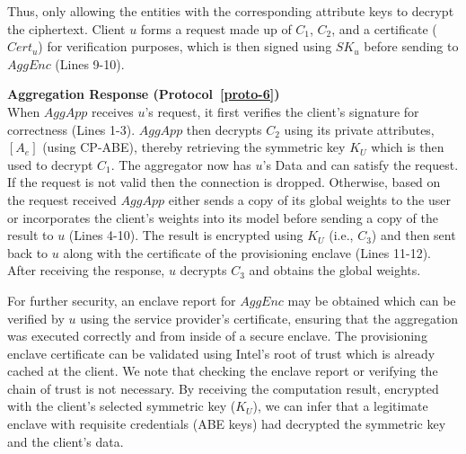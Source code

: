 Thus, only allowing the entities with the corresponding attribute keys to decrypt the ciphertext. Client $u$ forms a request made up of $C_1$, $C_2$, and a certificate ($Cert_u$) for verification purposes, which is then signed using $SK_u$ before sending to $AggEnc$ (Lines 9-10). 
\bigskip


\noindent
{\bf Aggregation Response (Protocol~\ref{proto-6})}
\\
\noindent
When $AggApp$ receives $u$'s request, it first verifies the client's signature for correctness (Lines 1-3). $AggApp$ then decrypts $C_2$ using its private attributes, $[A_{e}]$ (using CP-ABE), thereby retrieving the symmetric key $K_U$ which is then used to decrypt $C_1$. The aggregator now has $u$'s Data and can satisfy the request. If the request is not valid then the connection is dropped. Otherwise, based on the request received $AggApp$ either sends a copy of its global weights to the user or incorporates the client's weights into its model before sending a copy of the result to $u$ (Lines 4-10). The result is encrypted using $K_U$ (i.e., $C_3$) and then sent back to $u$ along with the certificate of the provisioning enclave (Lines 11-12). After receiving the response, $u$ decrypts $C_3$ and obtains the global weights.

For further security, an enclave report for $AggEnc$ may be obtained which can be verified by $u$ using the service provider's certificate, ensuring that the aggregation was executed correctly and from inside of a secure enclave. The provisioning enclave certificate can be validated using Intel’s root of trust which is already cached at the client. 
We note that checking the enclave report or verifying the chain of trust is not necessary. By receiving the computation result, encrypted with the client’s selected symmetric key ($K_U$), we can infer that a legitimate enclave with requisite credentials (ABE keys) had decrypted the symmetric key and the client’s data.

    



